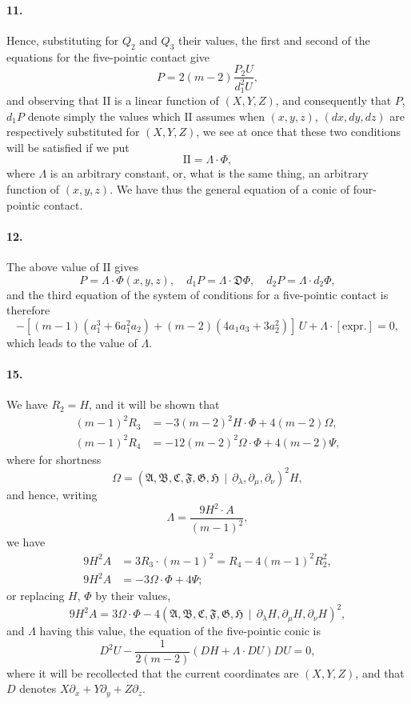 \documentclass[12pt,a4paper]{article}
\theoremstyle{plain}
\begin{document}
\paragraph{11.}
Hence,  substituting   for   $Q_2$  and  $Q_3$  their  values,   the  first  and    second   of   the
equations  for  the  five-pointic  contact  give
\[
P = 2(m-2) \frac{P_2 U}{d_1^2 U},
\]
and  observing  that  $\mathrm{II}$  is  a  linear  function  of  $(X, Y, Z)$,  and  consequently  that  $P$,  $d_1 P$
denote  simply  the  values  which  $\mathrm{II}$  assumes  when  $(x, y, z)$,  $(dx, dy, dz)$  are  respectively
substituted  for  $(X, Y, Z)$,  we  see  at  once  that  these  two  conditions  will  be  satisfied  if
we  put
\[
\mathrm{II} = \Lambda \cdot \Phi,
\]
where  $\Lambda$  is  an  arbitrary  constant,  or,  what  is  the  same  thing,  an  arbitrary  function  of
$(x, y, z)$.     We  have  thus  the  general  equation  of  a  conic  of  four-pointic  contact.

\paragraph{12.}
The  above  value  of  $\mathrm{II}$  gives
\[
P = \Lambda \cdot \Phi(x, y, z), \quad d_1 P = \Lambda \cdot \mathfrak{D} \Phi, \quad d_2 P = \Lambda \cdot d_2 \Phi,
\]
and  the  third  equation  of  the  system  of  conditions  for  a  five-pointic  contact  is  therefore
\[
-[(m-1)(a_1^3 + 6a_1^2 a_2) + (m-2)(4a_1 a_3 + 3a_2^2)] \, U + \Lambda \cdot [\text{expr.}] = 0,
\]
which  leads  to  the  value  of  $\Lambda$.


\paragraph{15.}
We  have  $R_2 = H$,  and  it  will  be  shown  that
\begin{align*}
(m-1)^2 R_3 &= -3(m-2)^2 H \cdot \Phi + 4(m-2) \Omega, \\
(m-1)^2 R_4 &= -12(m-2)^2 \Omega \cdot \Phi + 4(m-2) \Psi,
\end{align*}
where  for  shortness
\[
\Omega = (\mathfrak{A}, \mathfrak{B}, \mathfrak{C}, \mathfrak{F}, \mathfrak{G}, \mathfrak{H} \,\!\!\mid\, \partial_\lambda, \partial_\mu, \partial_\nu)^2 H,
\]
and  hence,  writing
\[
\Lambda = \frac{9H^2 \cdot A}{(m-1)^2},
\]
we  have
\begin{align*}
9H^2 A &= 3R_3 \cdot (m-1)^2 = R_4 - 4(m-1)^2 R_2^2, \\
9H^2 A &= -3\Omega \cdot \Phi + 4\Psi;
\end{align*}
or  replacing  $H$,  $\Phi$  by  their  values,
\[
9H^2 A = 3\Omega \cdot \Phi - 4(\mathfrak{A}, \mathfrak{B}, \mathfrak{C}, \mathfrak{F}, \mathfrak{G}, \mathfrak{H} \,\!\!\mid\, \partial_\lambda H, \partial_\mu H, \partial_\nu H)^2,
\]
and  $\Lambda$  having  this  value,  the  equation  of  the  five-pointic  conic  is
\[
D^2 U - \frac{1}{2(m-2)} \left(DH + \Lambda \cdot DU\right) DU = 0,
\]
where  it  will  be  recollected  that  the  current  coordinates  are  $(X, Y, Z)$,  and  that  $D$
denotes  $X\partial_x + Y\partial_y + Z\partial_z$.
\end{document}
